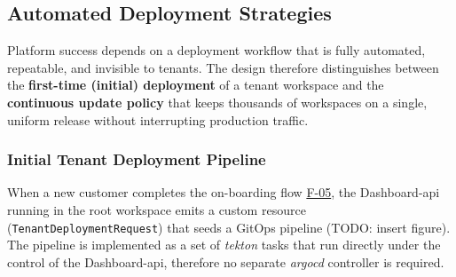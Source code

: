 \documentclass[11pt, a4paper, oneside, listof=totoc]{scrartcl}
\begin{document}
        \subsection{Automated Deployment Strategies}\label{subsec:deploymentStrategies}
            Platform success depends on a deployment workflow that is fully automated, repeatable,
            and invisible to tenants.
            The design therefore distinguishes between the \textbf{first-time (initial) deployment}
            of a tenant workspace and the \textbf{continuous update policy} that keeps thousands of
            workspaces on a single, uniform release without interrupting production traffic.

            \subsubsection{Initial Tenant Deployment Pipeline}\label{subsubsec:initialDeeployment}
                When a new customer completes the on-boarding flow \hyperlink{f5}{F-05}, the
                Dashboard-\gls{api} running in the root workspace emits a custom resource
                (\texttt{TenantDeploymentRequest}) that seeds a GitOps pipeline
                (TODO: insert figure).
                The pipeline is implemented as a set of \textit{\gls{tekton}} tasks that run
                directly under the control of the Dashboard-\gls{api}, therefore no separate
                \textit{\gls{argocd}} controller is required.
\end{document}
